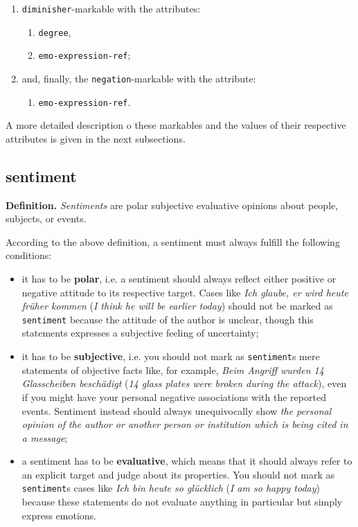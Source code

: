 \documentclass[11pt,a4paper]{article}
\theoremstyle{mytheoremstyle}
\begin{document}
\begin{multicols}{2}
\begin{enumerate}
\begin{enumerate}
    \end{enumerate}
  \item \texttt{diminisher}-markable with the attributes:
    \begin{enumerate}
    \item \texttt{degree},
    \item \texttt{emo-expression-ref};
    \end{enumerate}
  \item and, finally, the \texttt{negation}-markable with the
    attribute:
    \begin{enumerate}
    \item \texttt{emo-expression-ref}.
    \end{enumerate}
  \end{enumerate}
\end{multicols}
\noindent{}A more detailed description o these markables and the
values of their respective attributes is given in the next
subsections.

\subsection{sentiment}\label{sec:sentiment}
\noindent\textbf{Definition.} \emph{Sentiments} are polar subjective
evaluative opinions about people, subjects, or events.

According to the above definition, a sentiment must always fulfill the
following conditions:
\begin{itemize}
\item it has to be \textbf{polar}, i.e. a sentiment should always reflect
  either positive or negative attitude to its respective target.  Cases like
  \textit{Ich glaube, er wird heute fr\"uher kommen} (\textit{I think he will
    be earlier today}) should not be marked as \texttt{sentiment} because the
  attitude of the author is unclear, though this statements expresses a
  subjective feeling of uncertainty;

\item it has to be \textbf{subjective}, i.e. you should not mark as
  \texttt{sentiment}s mere statements of objective facts like, for example,
  \textit{Beim Angriff wurden 14 Glasscheiben besch\"adigt} (\textit{14 glass
    plates were broken during the attack}), even if you might have your
  personal negative associations with the reported events.  Sentiment instead
  should always unequivocally show \emph{the personal opinion of the author or
    another person or institution which is being cited in a message};

\item a sentiment has to be \textbf{evaluative}, which means that it should
  always refer to an explicit target and judge about its properties.  You
  should not mark as \texttt{sentiment}s cases like \textit{Ich bin heute so
    gl\"ucklich} (\textit{I am so happy today}) because these statements do
  not evaluate anything in particular but simply express emotions.
\end{itemize}
\end{document}
